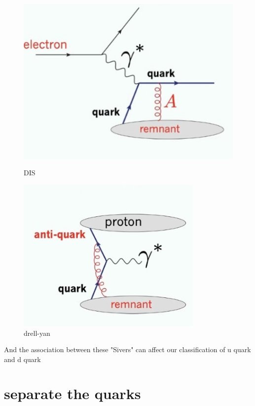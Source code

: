 \documentclass[12pt, a4paper, oneside]{article}
\begin{document}
\begin{spacing}{2.0}
\begin{figure}
    \begin{minipage}[t]{0.5\linewidth}
        \centering
        \includegraphics[scale=0.1]{DIS.jpg}
        \caption{DIS}
        \label{fig:side:a}
      \end{minipage}%
      \begin{minipage}[t]{0.5\linewidth}
        \centering
        \includegraphics[scale=0.3]{drell.jpg}
        \caption{drell-yan}
        \label{fig:side:b}
      \end{minipage}
\end{figure}

And the association between these "Sivers" can affect our classification of u quark and d quark

\section{separate the quarks}


\end{spacing}
\end{document}
